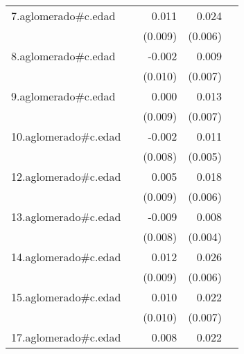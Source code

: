 {\begin{longtable}{l*{4}{D{.}{.}{-1}}}
\addlinespace
7.aglomerado#c.edad&                     &       0.011         &       0.024\sym{***}&                     \\
            &                     &     (0.009)         &     (0.006)         &                     \\
\addlinespace
8.aglomerado#c.edad&                     &      -0.002         &       0.009         &                     \\
            &                     &     (0.010)         &     (0.007)         &                     \\
\addlinespace
9.aglomerado#c.edad&                     &       0.000         &       0.013         &                     \\
            &                     &     (0.009)         &     (0.007)         &                     \\
\addlinespace
10.aglomerado#c.edad&                     &      -0.002         &       0.011\sym{*}  &                     \\
            &                     &     (0.008)         &     (0.005)         &                     \\
\addlinespace
12.aglomerado#c.edad&                     &       0.005         &       0.018\sym{**} &                     \\
            &                     &     (0.009)         &     (0.006)         &                     \\
\addlinespace
13.aglomerado#c.edad&                     &      -0.009         &       0.008         &                     \\
            &                     &     (0.008)         &     (0.004)         &                     \\
\addlinespace
14.aglomerado#c.edad&                     &       0.012         &       0.026\sym{***}&                     \\
            &                     &     (0.009)         &     (0.006)         &                     \\
\addlinespace
15.aglomerado#c.edad&                     &       0.010         &       0.022\sym{**} &                     \\
            &                     &     (0.010)         &     (0.007)         &                     \\
\addlinespace
17.aglomerado#c.edad&                     &       0.008         &       0.022\sym{**} &                     \\

\end{longtable}}
